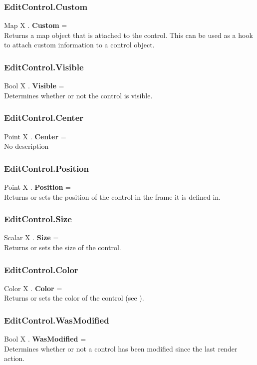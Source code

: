\subsubsection{EditControl.Custom \label{F:EditControl:Custom}}
Map X . \textbf{Custom} = \\
Returns a map object that is attached to the control. This can be used as a hook to attach custom information to a control object.

\subsubsection{EditControl.Visible \label{F:EditControl:Visible}}
Bool X . \textbf{Visible} = \\
Determines whether or not the control is visible.

\subsubsection{EditControl.Center \label{F:EditControl:Center}}
Point X . \textbf{Center} = \\
No description

\subsubsection{EditControl.Position \label{F:EditControl:Position}}
Point X . \textbf{Position} = \\
Returns or sets the position of the control in the frame it is defined in.

\subsubsection{EditControl.Size \label{F:EditControl:Size}}
Scalar X . \textbf{Size} = \\
Returns or sets the size of the control.

\subsubsection{EditControl.Color \label{F:EditControl:Color}}
Color X . \textbf{Color} = \\
Returns or sets the color of the control (see ).

\subsubsection{EditControl.WasModified \label{F:EditControl:WasModified}}
Bool X . \textbf{WasModified} = \\
Determines whether or not a control has been modified since the last render action.


